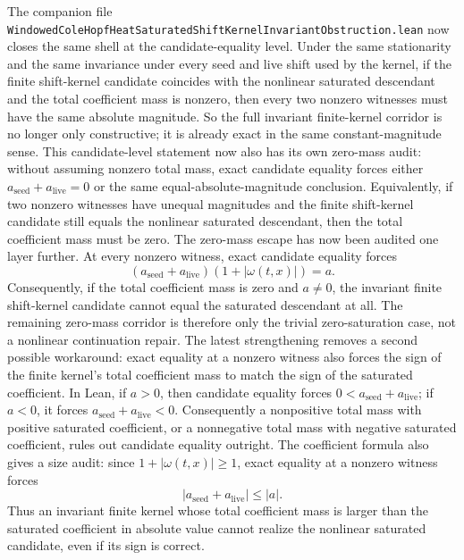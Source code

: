 \documentclass[11pt]{article}
\begin{document}
The companion file
\texttt{WindowedColeHopfHeatSaturatedShiftKernelInvariantObstruction.lean}
now closes the same shell at the candidate-equality level.  Under the same
stationarity and the same invariance under every seed and live shift used by the
kernel, if the finite shift-kernel candidate coincides with the nonlinear
saturated descendant and the total coefficient mass is nonzero, then every two
nonzero witnesses must have the same absolute magnitude.  So the full invariant
finite-kernel corridor is no longer only constructive; it is already exact in
the same constant-magnitude sense.  This candidate-level statement now also has
its own zero-mass audit: without assuming nonzero total mass, exact candidate
equality forces either \(a_{\mathrm{seed}}+a_{\mathrm{live}}=0\) or the same
equal-absolute-magnitude conclusion.  Equivalently, if two nonzero witnesses
have unequal magnitudes and the finite shift-kernel candidate still equals the
nonlinear saturated descendant, then the total coefficient mass must be zero.
The zero-mass escape has now been audited one layer further.  At every nonzero
witness, exact candidate equality forces
\[
  (a_{\mathrm{seed}}+a_{\mathrm{live}})(1+|\omega(t,x)|)=a.
\]
Consequently, if the total coefficient mass is zero and \(a\neq 0\), the
invariant finite shift-kernel candidate cannot equal the saturated descendant at
all.  The remaining zero-mass corridor is therefore only the trivial
zero-saturation case, not a nonlinear continuation repair.
The latest strengthening removes a second possible workaround: exact equality
at a nonzero witness also forces the sign of the finite kernel's total
coefficient mass to match the sign of the saturated coefficient.  In Lean, if
\(a>0\), then candidate equality forces
\(0<a_{\mathrm{seed}}+a_{\mathrm{live}}\); if \(a<0\), it forces
\(a_{\mathrm{seed}}+a_{\mathrm{live}}<0\).  Consequently a nonpositive total
mass with positive saturated coefficient, or a nonnegative total mass with
negative saturated coefficient, rules out candidate equality outright.
The coefficient formula also gives a size audit: since \(1+|\omega(t,x)|\ge 1\),
exact equality at a nonzero witness forces
\[
  |a_{\mathrm{seed}}+a_{\mathrm{live}}|\le |a|.
\]
Thus an invariant finite kernel whose total coefficient mass is larger than
the saturated coefficient in absolute value cannot realize the nonlinear
saturated candidate, even if its sign is correct.
\end{document}
